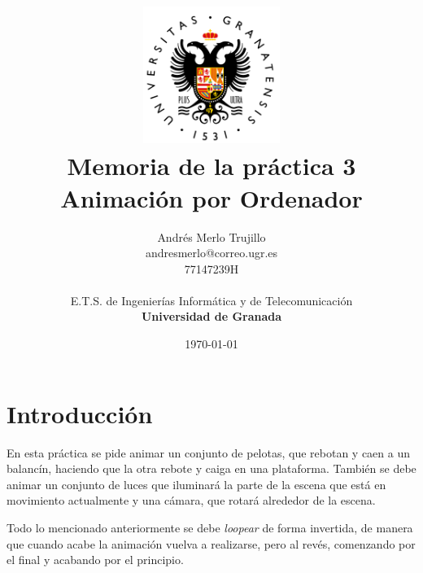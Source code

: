\documentclass{article}
\title{
\includegraphics[width=1.75in]{imagenes/UGR-Logo.png} \\
\vspace*{1in}
\textbf{Memoria de la práctica 3} \\
Animación por Ordenador \\
\vspace*{0.5in}}
\author{Andrés Merlo Trujillo \\
andresmerlo@correo.ugr.es \\
77147239H \\ 
\vspace*{0.5in} \\
E.T.S. de Ingenierías Informática y de Telecomunicación \\
\textbf{Universidad de Granada}} \date{\today}
\begin{document}
\begin{titlingpage}
\maketitle
\end{titlingpage}

\tableofcontents

\newpage

\pagestyle{fancy}   %



\section{Introducción}
En esta práctica se pide animar un conjunto de pelotas, que rebotan y caen a un balancín, haciendo que la otra rebote y caiga en una plataforma. También se debe animar un conjunto de luces que iluminará la parte de la escena que está en movimiento actualmente y una cámara, que rotará alrededor de la escena.

Todo lo mencionado anteriormente se debe \textit{loopear} de forma invertida, de manera que cuando acabe la animación vuelva a realizarse, pero al revés, comenzando por el final y acabando por el principio.
\end{document}

